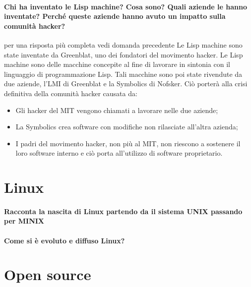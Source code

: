 \documentclass[a4paper]{article}
\begin{document}
		\paragraph{Chi ha inventato le Lisp machine? Cosa sono? Quali aziende le hanno inventate? Perché queste aziende hanno avuto un impatto sulla comunità hacker?}
		{per una risposta più completa vedi domanda precedente}
		Le Lisp machine sono state inventate da Greenblat, uno dei fondatori del movimento hacker. Le Lisp machine sono delle macchine concepite al fine di lavorare in sintonia con il linguaggio di programmazione Lisp. Tali macchine sono poi state rivendute da due aziende, l'LMI di Greenblat e la Symbolics di Nofsker. Ciò porterà alla crisi definitiva della comunità hacker causata da:
		\begin{itemize}
			\item Gli hacker del MIT vengono chiamati a lavorare nelle due aziende;
			\item La Symbolics crea software con modifiche non rilasciate all'altra azienda;
			\item I padri del movimento hacker, non più al MIT, non riescono a sostenere il loro software interno e ciò porta all'utilizzo di software proprietario.
		\end{itemize}
	

	\section{Linux}
		
		\paragraph{Racconta la nascita di Linux partendo da il sistema UNIX passando per MINIX}
		
		\paragraph{Come si è evoluto e diffuso Linux?}
	
	
	\section{Open source}	
\end{document}
